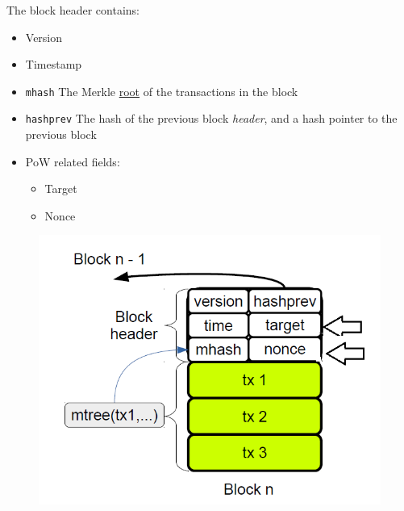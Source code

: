 \begin{paracol}{2}
   \ns
   The block header contains:
   \begin{itemize}
      \item Version
      \item Timestamp
      \item \texttt{mhash} The Merkle \ul{root} of the transactions in the block
      \item \texttt{hashprev} The hash of the previous block \textit{header}, and a hash pointer to the previous block
      \item PoW related fields:
      \begin{itemize}
         \item Target
         \item Nonce
      \end{itemize}
   \end{itemize}
   \switchcolumn

   \colfill
   \begin{figure}[htbp]
      \centering
      \includegraphics{images/bitcoin_blockheader.png}
      \label{fig:bitcoin_blockheader}
   \end{figure}
   \colfill

\end{paracol}

